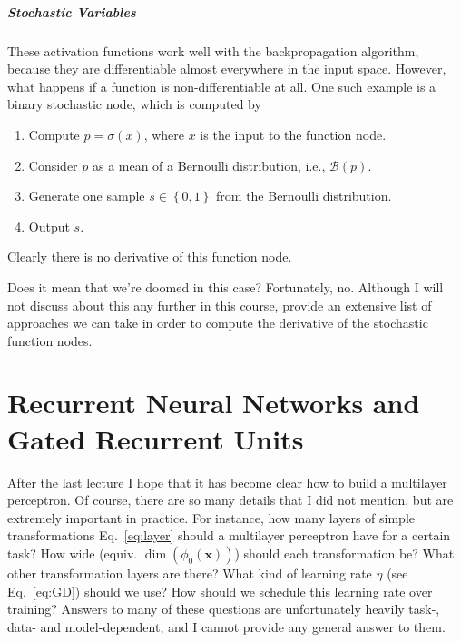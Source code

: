 \documentclass{report}
\newcommand{\vect}[1]{\mathbf{#1}}
\newcommand{\vx}[0]{\vect{x}}
\newcommand{\BB}[0]{\mathcal{B}}
\begin{document}
\paragraph{Stochastic Variables}
These activation functions work well with the backpropagation algorithm, because
they are differentiable almost everywhere in the input space. However, what
happens if a function is non-differentiable at all. One such example is a binary
stochastic node, which is computed by
\begin{enumerate}
    \itemsep 0em
    \item Compute $p = \sigma(x)$, where $x$ is the input to the function node.
    \item Consider $p$ as a mean of a Bernoulli distribution, i.e., $\BB(p)$.
    \item Generate one sample $s \in \left\{ 0, 1\right\}$ from the Bernoulli distribution.
    \item Output $s$.
\end{enumerate}
Clearly there is no derivative of this function node. 

Does it mean that we're doomed in this case? Fortunately, no. Although I will
not discuss about this any further in this course,
\citet{bengio2013estimating} provide an extensive list of
approaches we can take in order to compute the derivative of the stochastic
function nodes.



\chapter{Recurrent Neural Networks and Gated Recurrent Units}
\label{chap:rnn}

After the last lecture I hope that it has become clear how to build a multilayer
perceptron. Of course, there are so many details that I did not mention, but are
extremely important in practice. For instance, how many layers of simple
transformations Eq.~\eqref{eq:layer} should a multilayer perceptron have for a
certain task? How wide (equiv. $\dim(\phi_0(\vx))$) should each transformation
be? What other transformation layers are there? What kind of learning rate
$\eta$ (see Eq.~\eqref{eq:GD}) should we use? How should we schedule this
learning rate over training? Answers to many of these questions are
unfortunately heavily task-, data- and model-dependent, and I cannot provide any
general answer to them.

\end{document}
